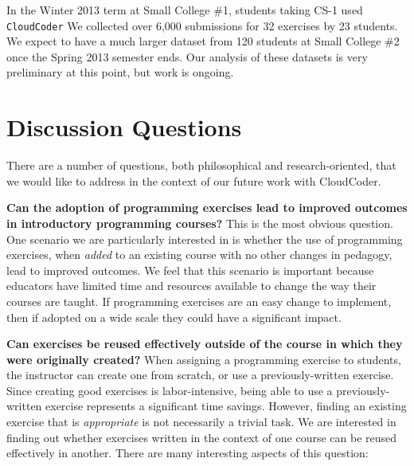 \documentclass{sig-alternate}
\begin{document}
In the Winter 2013 term at Small College \#1, students taking CS-1 used {\tt CloudCoder}
%
% 
We collected over 6,000 submissions
for 32 exercises by 23 students.  We expect to have a much larger
dataset from 120 students at 
Small College \#2
once the Spring 2013 semester ends.  Our analysis of these datasets is
very preliminary at this point, but work is ongoing.


\section{Discussion Questions}

%

There are a number of questions, both philosophical and research-oriented,
that we would like to address in the context of our future work with CloudCoder.

{\bf Can the adoption of programming exercises lead to improved outcomes
in introductory programming courses?}  This is the most obvious
question.  One scenario we are particularly interested in is whether
the use of programming exercises, when {\em added} to an existing course with
no other changes in pedagogy, lead to improved outcomes.  We feel
that this scenario is important because educators have limited time
and resources available to change the way their courses are taught.
If programming exercises are an easy change to implement, then
if adopted on a wide scale they could have a significant impact.

{\bf Can exercises be reused effectively outside of the course in which
they were originally created?}  When assigning a programming exercise to
students, the instructor can create one from scratch, or use a
previously-written exercise.  Since creating good exercises is labor-intensive,
being able to use a previously-written exercise represents a significant
time savings.  However, finding an existing exercise that is {\em appropriate}
is not necessarily a trivial task.  We are interested in finding
out whether exercises written in the context of one course can be reused
effectively in another.  There are many interesting aspects of
this question:
\end{document}
